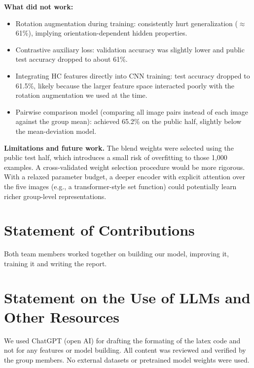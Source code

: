 \documentclass[11pt]{article}
\begin{document}
\textbf{What did not work:}
\begin{itemize}[noitemsep]
  \item Rotation augmentation during training: consistently hurt generalization ($\approx$61\%),
        implying orientation-dependent hidden properties.
  \item Contrastive auxiliary loss: validation accuracy was slightly lower and public test accuracy
        dropped to about 61\%.
  \item Integrating HC features directly into CNN training: test accuracy dropped to 61.5\%, likely
        because the larger feature space interacted poorly with the rotation augmentation we used at
        the time.
  \item Pairwise comparison model (comparing all image pairs instead of each image against the group
        mean): achieved 65.2\% on the public half, slightly below the mean-deviation model.
\end{itemize}

\textbf{Limitations and future work.}
The blend weights were selected using the public test half, which introduces a small risk of overfitting
to those 1{,}000 examples. A cross-validated weight selection procedure would be more rigorous. With
a relaxed parameter budget, a deeper encoder with explicit attention over the five images (e.g., a
transformer-style set function) could potentially learn richer group-level representations.

\section*{Statement of Contributions}

Both team members worked together on building our model, improving it, training it and writing the report.

\section*{Statement on the Use of LLMs and Other Resources}

We used ChatGPT (open AI) for drafting
the formating of the latex code and not for any features or model building. All content was reviewed and verified by the group members. No external
datasets or pretrained model weights were used.
\end{document}
